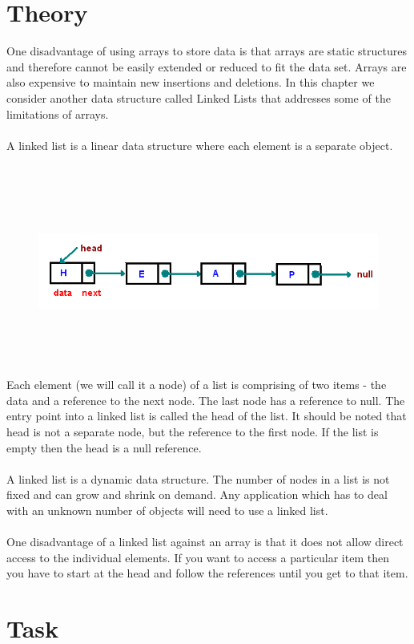 \documentclass[11pt]{article}            %
\begin{document}
\section{Theory }              
\justify One disadvantage of using arrays to store data is that arrays are static structures and therefore cannot be easily extended or reduced to fit the data set. Arrays are also expensive to maintain new insertions and deletions. In this chapter we consider another data structure called Linked Lists that addresses some of the limitations of arrays.\\~\\
A linked list is a linear data structure where each element is a separate object.\\~\\
\begin{figure}[H]
\centering
  \includegraphics[width=12cm,height=6cm,keepaspectratio]{5.png}    
\end{figure}
Each element (we will call it a node) of a list is comprising of two items - the data and a reference to the next node. The last node has a reference to null. The entry point into a linked list is called the head of the list. It should be noted that head is not a separate node, but the reference to the first node. If the list is empty then the head is a null reference.\\~\\
A linked list is a dynamic data structure. The number of nodes in a list is not fixed and can grow and shrink on demand. Any application which has to deal with an unknown number of objects will need to use a linked list.\\~\\
One disadvantage of a linked list against an array is that it does not allow direct access to the individual elements. If you want to access a particular item then you have to start at the head and follow the references until you get to that item.
\section{Task}  
\end{document}
